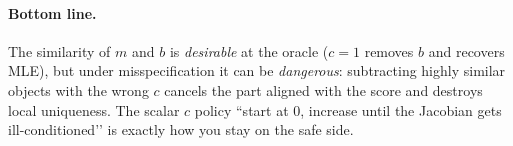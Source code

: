 \paragraph{Bottom line.}
The similarity of $m$ and $b$ is \emph{desirable} at the oracle ($c=1$ removes $b$ and recovers MLE), but under misspecification it can be \emph{dangerous}: subtracting highly similar objects with the wrong $c$ cancels the part aligned with the score and destroys local uniqueness. The scalar $c$ policy “start at $0$, increase until the Jacobian gets ill-conditioned’’ is exactly how you stay on the safe side.
